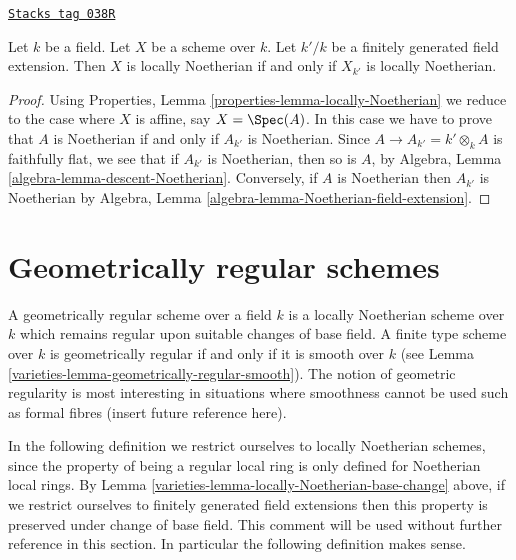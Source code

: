 \begin{lemma}
\label{varieties-lemma-locally-Noetherian-base-change}
\href{https://stacks.math.columbia.edu/tag/038R}{\texttt{Stacks tag 038R}}

Let $k$ be a field.
Let $X$ be a scheme over $k$.
Let $k'/k$ be a finitely generated field extension.
Then $X$ is locally Noetherian if and only if $X_{k'}$ is locally
Noetherian.
\end{lemma}

\begin{proof}
Using Properties, Lemma \ref{properties-lemma-locally-Noetherian}
we reduce to the case where $X$ is
affine, say $X = \Spec(A)$. In this case we have to prove that
$A$ is Noetherian if and only if $A_{k'}$ is Noetherian.
Since $A \to A_{k'} = k' \otimes_k A$ is faithfully flat, we see
that if $A_{k'}$ is Noetherian, then so is $A$, by
Algebra, Lemma \ref{algebra-lemma-descent-Noetherian}.
Conversely, if $A$ is Noetherian then $A_{k'}$ is Noetherian by
Algebra, Lemma \ref{algebra-lemma-Noetherian-field-extension}.
\end{proof}

\section{Geometrically regular schemes}
\label{varieties-section-geometrically-regular}
A geometrically regular scheme over a field $k$ is a locally Noetherian
scheme over $k$ which remains regular upon suitable changes of base field.
A finite type scheme over $k$ is geometrically regular if and only
if it is smooth over $k$ (see Lemma \ref{varieties-lemma-geometrically-regular-smooth}).
The notion of geometric regularity is most interesting in situations
where smoothness cannot be used such as formal fibres (insert future
reference here).

\medskip\noindent
In the following definition we restrict ourselves to locally Noetherian
schemes, since the property of being a regular local ring is only
defined for Noetherian local rings. By
Lemma \ref{varieties-lemma-locally-Noetherian-base-change}
above, if we restrict ourselves to finitely generated field extensions then
this property is preserved under change of base field. This comment will be
used without further reference in this section. In particular the following
definition makes sense.

